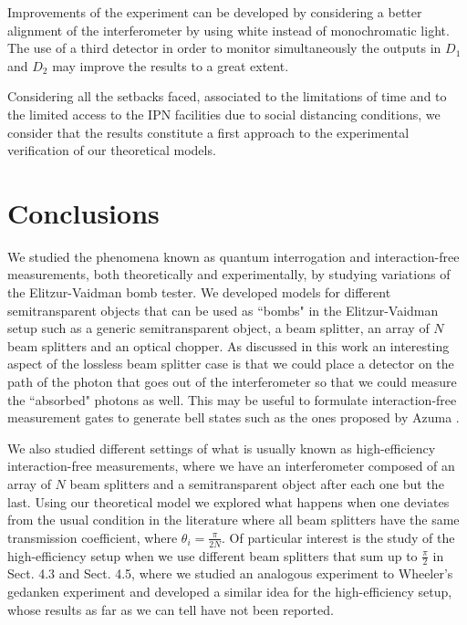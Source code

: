 \documentclass[12pt]{book}
\newcommand\blankpage{
    \null
    \thispagestyle{empty}
    \addtocounter{page}{0}
    \newpage
    }
\begin{document}
Improvements of the experiment can be developed by considering a better alignment of the interferometer by using white instead of monochromatic light. The use of a third detector in order to monitor simultaneously the outputs in $D_{1}$ and $D_{2}$ may improve the results to a great extent.

Considering all the setbacks faced, associated to the limitations of time and to the limited access to the IPN facilities due to social distancing conditions, we consider that the results constitute a first approach to the experimental verification of our theoretical models.



\pagebreak

\blankpage

\chapter*{Conclusions}

\pagestyle{plain}

We studied the phenomena known as quantum interrogation and interaction-free measurements, both theoretically and experimentally, by studying variations of the Elitzur-Vaidman bomb tester. We developed models for different semitransparent objects that can be used as ``bombs" in the Elitzur-Vaidman setup such as a generic semitransparent object, a beam splitter, an array of $N$ beam splitters and an optical chopper. As discussed in this work an interesting aspect of the lossless beam splitter case is that we could place a detector on the path of the photon that goes out of the interferometer so that we could measure the ``absorbed" photons as well. This may be useful to formulate interaction-free measurement gates to generate bell states such as the ones proposed by Azuma \cite{computacion}.
We also studied different settings of what is usually known as high-efficiency interaction-free measurements, where we have an interferometer composed of an array of $N$ beam splitters and a semitransparent object after each one but the last. Using our theoretical model we explored what happens when one deviates from the usual condition in the literature where all beam splitters have the same transmission coefficient, where  $\theta_{i}=\frac{\pi}{2N}$. Of particular interest is the study of the high-efficiency setup when we use different beam splitters that sum up to $\frac{\pi}{2}$ in Sect. 4.3 and Sect. 4.5, where we studied an analogous experiment to Wheeler's gedanken experiment \cite{azuri} and developed a similar idea for the high-efficiency setup, whose results as far as we can tell have not been reported.
\end{document}
